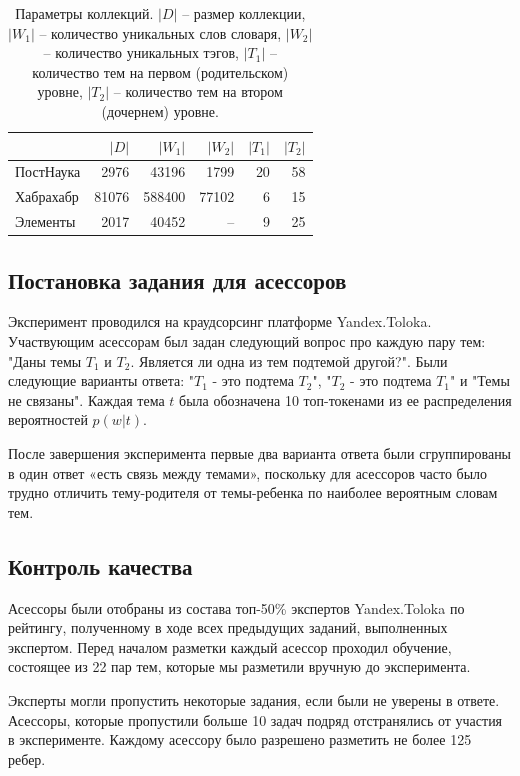 \begin{table}[h!]
\centering
\begin{tabular}{l|r|r|r|r|r}
& $|D|$ & $|W_1|$ & $|W_2|$ & $|T_1|$ & $|T_2|$ \\
\hline
ПостНаука & 2976  & 43196  & 1799 & 20 & 58 \\
\hline
Хабрахабр & 81076 & 588400 & 77102 & 6 & 15 \\
\hline
Элементы & 2017  & 40452  & -- & 9 & 25 \\
\end{tabular}
\caption{\label{table:tm_datasets}Параметры коллекций. $|D|$ -- размер коллекции, $|W_1|$ -- количество уникальных слов словаря, $|W_2|$ -- количество уникальных тэгов, $|T_1|$ -- количество тем на первом (родительском) уровне, $|T_2|$ -- количество тем на втором (дочернем) уровне.}
\end{table}

\subsection{Постановка задания для асессоров}

Эксперимент проводился на краудсорсинг
платформе Yandex.Toloka. Участвующим асессорам был задан следующий вопрос про каждую пару тем: "Даны темы $T_1$ и $T_2$. Является ли одна из тем подтемой другой?". Были следующие варианты ответа: "$T_1$ - это подтема $T_2$", "$T_2$ - это подтема $T_1$" и "Темы не связаны". Каждая тема $t$ была обозначена 10 топ-токенами из ее распределения вероятностей $p(w|t)$.

После завершения эксперимента первые два варианта ответа были сгруппированы в один ответ «есть связь между темами», поскольку для асессоров часто было трудно отличить тему-родителя от темы-ребенка по наиболее вероятным словам тем. 

\subsection{Контроль качества}
Асессоры были отобраны из состава топ-50\% экспертов Yandex.Toloka по рейтингу, полученному в ходе всех предыдущих заданий, выполненных
экспертом. Перед началом разметки каждый асессор проходил обучение, состоящее из 22 пар тем, которые мы разметили вручную до эксперимента.

Эксперты могли пропустить некоторые задания, если были не уверены в ответе. Асессоры, которые пропустили больше 10 задач подряд отстранялись от участия в эксперименте. Каждому асессору было разрешено разметить не более 125 ребер. 

